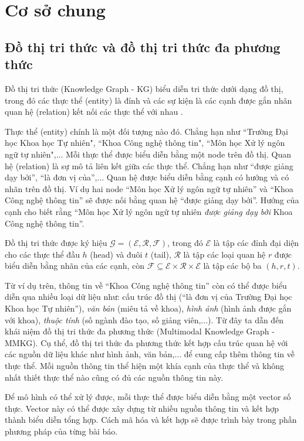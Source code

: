 \section{Cơ sở chung}
\subsection{Đồ thị tri thức và đồ thị tri thức đa phương thức}

Đồ thị tri thức (Knowledge Graph - KG) biểu diễn tri thức dưới dạng đồ thị,
trong đó các thực thể (entity) là đỉnh và các sự kiện là các cạnh được gắn nhãn quan hệ (relation) kết nối các thực thể với nhau \cite{balkir2021}. 

Thực thể (entity) chính là một đối tượng nào đó. Chẳng hạn như ``Trường Đại học Khoa học Tự nhiên", ``Khoa Công nghệ thông tin", ``Môn học Xử lý ngôn ngữ tự nhiên",...
 Mỗi thực thể được biểu diễn bằng một node trên đồ thị. Quan hệ (relation) là sự mô tả liên kết giữa các thực thể.
 Chẳng hạn như ``được giảng dạy bởi'', ``là đơn vị của'',... Quan hệ được biểu diễn bằng cạnh có hướng và có nhãn trên đồ thị.
 Ví dụ hai node ``Môn học Xử lý ngôn ngữ tự nhiên'' và ``Khoa Công nghệ thông tin'' sẽ được nối bằng quan hệ ``được giảng dạy bởi''.
 Hướng của cạnh cho biết rằng ``Môn học Xử lý ngôn ngữ tự nhiên \textit{được giảng dạy bởi} Khoa Công nghệ thông tin''.

Đồ thị tri thức được ký hiệu $\mathcal{G} = (\mathcal{E}, \mathcal{R}, \mathcal{F})$,
trong đó $\mathcal{E}$ là tập các đỉnh đại diện cho các thực thể đầu $h$ (head) và đuôi $t$ (tail),
$\mathcal{R}$ là tập các loại quan hệ $r$ được biểu diễn bằng nhãn của các cạnh, còn $\mathcal{F} \subseteq \mathcal{E} \times \mathcal{R} \times \mathcal{E}$ là tập các bộ ba $(h,r,t)$.


Từ ví dụ trên, thông tin về ``Khoa Công nghệ thông tin'' còn có thể được biểu diễn qua nhiều loại dữ liệu như: cấu trúc đồ thị (``là đơn vị của Trường Đại học Khoa học Tự nhiên''),
\textit{văn bản} (miêu tả về khoa), \textit{hình ảnh} (hình ảnh được gắn với khoa), \textit{thuộc tính} (số ngành đào tạo, số giảng viên,...).
Từ đây ta dẫn đến khái niệm đồ thị tri thức đa phương thức (Multimodal Knowledge Graph - MMKG).
Cụ thể, đồ thị tri thức đa phương thức kết hợp cấu trúc quan hệ với các nguồn dữ liệu khác như hình ảnh, văn bản,... để cung cấp thêm thông tin về thực thể.
Mỗi nguồn thông tin thể hiện một khía cạnh của thực thể và không nhất thiết thực thể nào cũng có đủ các nguồn thông tin này.

Để mô hình có thể xử lý được, mỗi thực thể được biểu diễn bằng một vector số thực.
Vector này có thể được xây dựng từ nhiều nguồn thông tin và kết hợp thành biểu diễn tổng hợp.
Cách mã hóa và kết hợp sẽ được trình bày trong phần phương pháp của từng bài báo.


